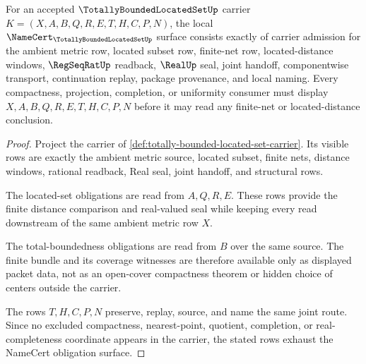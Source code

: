 \begin{theorem}
\label{thm:totally-bounded-located-set-namecert-obligations}
For an accepted $\TotallyBoundedLocatedSetUp$ carrier $K=(X,A,B,Q,R,E,T,H,C,P,N)$, the local $\NameCert_{\TotallyBoundedLocatedSetUp}$ surface consists exactly of carrier admission for the ambient metric row, located subset row, finite-net row, located-distance windows, $\RegSeqRatUp$ readback, $\RealUp$ seal, joint handoff, componentwise transport, continuation replay, package provenance, and local naming. Every compactness, projection, completion, or uniformity consumer must display $X,A,B,Q,R,E,T,H,C,P,N$ before it may read any finite-net or located-distance conclusion.
\end{theorem}
\begin{proof}
Project the carrier of \autoref{def:totally-bounded-located-set-carrier}. Its visible rows are exactly the ambient metric source, located subset, finite nets, distance windows, rational readback, Real seal, joint handoff, and structural rows.

The located-set obligations are read from $A,Q,R,E$. These rows provide the finite distance comparison and real-valued seal while keeping every read downstream of the same ambient metric row $X$.

The total-boundedness obligations are read from $B$ over the same source. The finite bundle and its coverage witnesses are therefore available only as displayed packet data, not as an open-cover compactness theorem or hidden choice of centers outside the carrier.

The rows $T,H,C,P,N$ preserve, replay, source, and name the same joint route. Since no excluded compactness, nearest-point, quotient, completion, or real-completeness coordinate appears in the carrier, the stated rows exhaust the NameCert obligation surface.
\end{proof}

